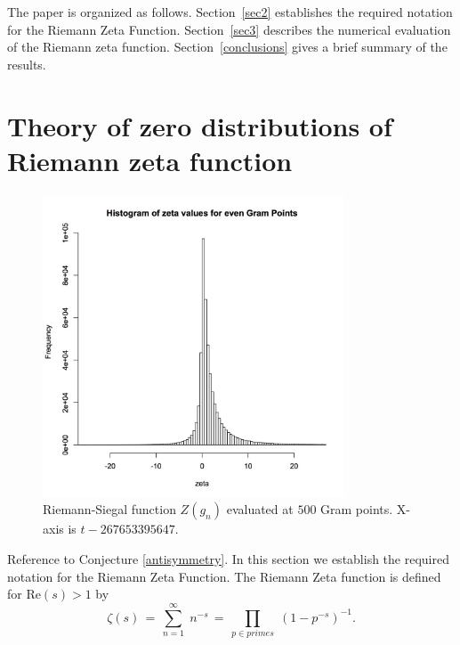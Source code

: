 \documentclass[twoside]{article}
\begin{document}
The paper is organized as follows.
Section~\ref{sec2} establishes the required notation for the 
Riemann Zeta Function. 
Section~\ref{sec3} describes the numerical evaluation of the Riemann zeta function. 
Section~\ref{conclusions}
gives a brief summary of the results. 


\section{\label{sec2}Theory of zero distributions of Riemann zeta function }

\begin{figure}
\centering
\includegraphics[width=0.8\textwidth]{ezeta.jpg}
\caption[]{ 
 Riemann-Siegal function $Z(g_n)$ evaluated at $500$ Gram points.
 X-axis is $t-267653395647$.}
\label{ZGram}
\end{figure}

Reference to Conjecture \ref{antisymmetry}.
In this section we  establish the required notation for the 
Riemann Zeta Function. 
The Riemann Zeta function is defined for $\mathrm{Re} (s) > 1$ by
\begin{equation}
\zeta ( s ) \, = \, \sum^{\infty}_{n = 1} \; n^{-s} \, = \, \prod_{p \in primes} \;
\left( 1 - p^{-s} \right)^{-1}.
\label{eqRie}
\end{equation}
\end{document}
